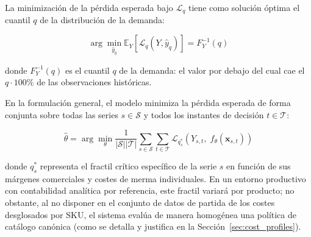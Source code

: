 La minimización de la pérdida esperada bajo $\mathcal{L}_q$ tiene como solución óptima el cuantil $q$ de la distribución de la demanda:

\begin{equation}
    \arg\min_{\hat{y}_q} \mathbb{E}_{Y} \left[ \mathcal{L}_q(Y, \hat{y}_q) \right] = F_{Y}^{-1}(q)
\end{equation}

donde $F_Y^{-1}(q)$ es el cuantil $q$ de la demanda: el valor por debajo del cual cae el
$q \cdot 100\%$ de las observaciones históricas.

\begin{center}
\end{center}

En la formulación general, el modelo minimiza la pérdida esperada de forma conjunta sobre todas las series $s \in \mathcal{S}$ y todos los instantes de decisión $t \in \mathcal{T}$:

\begin{equation}
    \hat{\theta} = \arg\min_{\theta}
    \frac{1}{|\mathcal{S}||\mathcal{T}|}
    \sum_{s \in \mathcal{S}} \sum_{t \in \mathcal{T}}
    \mathcal{L}_{q_s^*}\!\left(Y_{s,t},\; f_\theta(\mathbf{x}_{s,t})\right)
    \label{eq:training_objective}
\end{equation}

donde $q_s^*$ representa el fractil crítico específico de la serie $s$ en función de sus márgenes comerciales y costes de merma individuales. En un entorno productivo con contabilidad analítica por referencia, este fractil variará por producto; no obstante, al no disponer en el conjunto de datos de partida de los costes desglosados por SKU, el sistema evalúa de manera homogénea una política de catálogo canónica (como se detalla y justifica en la Sección~\ref{sec:cost_profiles}).

